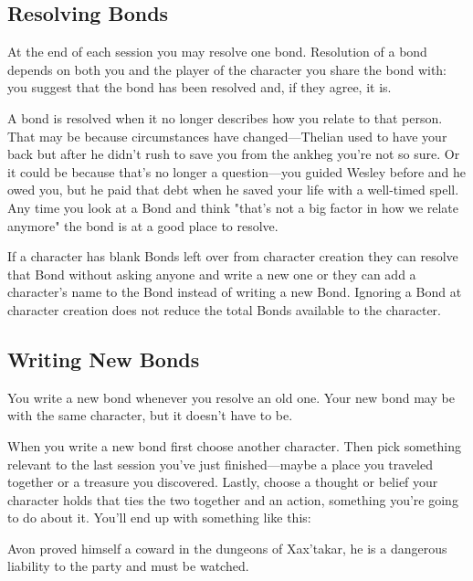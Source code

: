  
\subsection{Resolving Bonds}   
 

At the end of each session you may resolve one bond. Resolution of a bond depends on both you and the player of the character you share the bond with: you suggest that the bond has been resolved and, if they agree, it is.

 

A bond is resolved when it no longer describes how you relate to that person. That may be because circumstances have changed—Thelian used to have your back but after he didn't rush to save you from the ankheg you're not so sure. Or it could be because that's no longer a question—you guided Wesley before and he owed you, but he paid that debt when he saved your life with a well-timed spell. Any time you look at a Bond and think "that's not a big factor in how we relate anymore" the bond is at a good place to resolve.

 

If a character has blank Bonds left over from character creation they can resolve that Bond without asking anyone and write a new one or they can add a character's name to the Bond instead of writing a new Bond. Ignoring a Bond at character creation does not reduce the total Bonds available to the character.

 
\subsection{Writing New Bonds}   
 

You write a new bond whenever you resolve an old one. Your new bond may be with the same character, but it doesn't have to be.

 

When you write a new bond first choose another character. Then pick something relevant to the last session you've just finished—maybe a place you traveled together or a treasure you discovered. Lastly, choose a thought or belief your character holds that ties the two together and an action, something you're going to do about it. You'll end up with something like this:

 
\startitemize[1,packed]

\item Avon proved himself a coward in the dungeons of Xax'takar, he is a dangerous liability to the party and must be watched.

